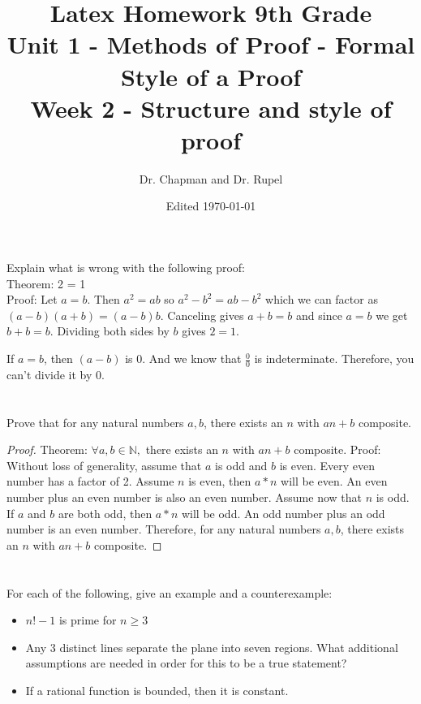 \documentclass{amsart}
\title{Latex Homework 9th Grade\\ Unit 1 - Methods of Proof - Formal Style of a Proof\\ Week 2 - Structure and style of proof}
\author{Dr. Chapman and Dr. Rupel}
\date{Edited \today}
\begin{document}
\maketitle

\section{}
    Explain what is wrong with the following proof:\\ Theorem: 2 = 1\\Proof: Let \(a = b\). Then \(a^2 = ab\) so \(a^2-b^2 = ab - b^2\) which we can factor as \((a-b)(a+b) = (a-b)b\). Canceling gives \(a+b = b\) and since \(a = b\) we get \(b+b = b\). Dividing both sides by \(b\) gives \(2 = 1\).

	If \( a = b\), then \((a-b)\) is 0. And we know that $\frac{0}{0}$ is indeterminate. Therefore, you can't divide it by 0.
\section{}
    Prove that for any natural numbers \(a,b\), there exists an \(n\) with \(an+b\) composite.
	\begin{proof}
	Theorem: $\forall a,b\in\mathbb{N},$ there exists an $n$ with $an+b$ composite.
	Proof: Without loss of generality, assume that $a$ is odd and $b$ is even. Every even number has a factor of 2. Assume \(n\) is even, then $a*n$ will be even. An even number plus an
	even number is also an even number. Assume now that $n$ is odd. If $a$ and $b$ are both odd, then $a*n$ will be odd. An odd number plus an odd number is an even number. Therefore, for any natural numbers $a,b$, there exists an $n$ with $an+b$ composite.
	\end{proof}
    
\section{}
    For each of the following, give an example and a counterexample:
    \begin{itemize}
        \item \(n!-1\) is prime for \(n \geq 3\)
        \item Any 3 distinct lines separate the plane into seven regions.  What additional assumptions are needed in order for this to be a true statement?
        \item If a rational function is bounded, then it is constant.
    \end{itemize}
\end{document}
